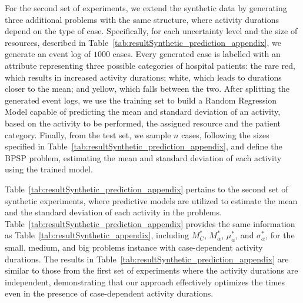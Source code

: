 \documentclass{article}
\newcommand{\act}[1]{\textsf{\footnotesize #1}}
\begin{document}
 
For the second set of experiments, we extend the synthetic data by generating three additional problems with the same structure, where activity durations depend on the type of case. Specifically, for each uncertainty level and the size of resources, described in Table~\ref{tab:resultSynthetic_prediction_appendix}, we generate an event log of $1000$ cases. Every generated case is labelled with an attribute representing three possible categories of hospital patients: the rare \act{red}, which results in increased activity durations; \act{white}, which leads to durations closer to the mean; and \act{yellow}, which falls between the two.
After splitting the generated event logs, we use the training set to build a Random Regression Model capable of predicting the mean and standard deviation of an activity, based on the activity to be performed, the assigned resource and the patient category. Finally, from the test set, we sample $n$ cases, following the sizes specified in Table~\ref{tab:resultSynthetic_prediction_appendix}, and define the BPSP problem, estimating the mean and standard deviation of each activity using the trained model.

Table~\ref{tab:resultSynthetic_prediction_appendix} pertains to the second set of synthetic experiments, where predictive models are utilized to estimate the mean and the standard deviation of each activity in the problems. 
Table~\ref{tab:resultSynthetic_prediction_appendix} provides the same information as Table~\ref{tab:resultSynthetic_appendix}, including $M^*_{C}$, $M^*_{\alpha}$, $\mu^*_{\alpha}$, and $\sigma^*_{\alpha}$, for the \act{small}, \act{medium}, and \act{big} problems instance with case-dependent activity durations. The results in Table~\ref{tab:resultSynthetic_prediction_appendix} are similar to those from the first set of experiments where the activity durations are independent, demonstrating that our approach effectively optimizes the times even in the presence of case-dependent activity durations.
\end{document}
